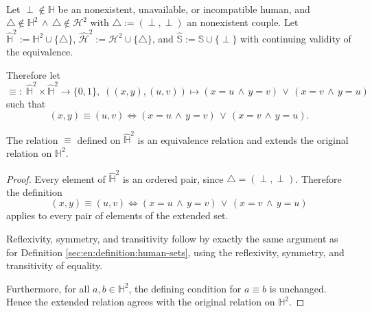 \begin{definition}\label{sec:en:definition:extended-human-sets}
    \leavevmode\\
    Let $\perp\notin\mathbb{H}$ be an nonexistent, unavailable, or incompatible human, and $\triangle\notin\mathbb{H}^2\,\land\,\triangle\notin\mathcal{H}^2$ with $\triangle:=(\perp,\perp)$ an nonexistent couple.
    Let $\hat{\mathbb{H}}^2:=\mathbb{H}^2\cup\{\triangle\}$, $\hat{\mathcal{H}}^2:=\mathcal{H}^2\cup\{\triangle\}$, and $\hat{\mathbb{S}}:=\mathbb{S}\cup\{\perp\}$ with continuing validity of the equivalence.

    Therefore let
    $$\equiv:\;\hat{\mathbb{H}}^2\times\hat{\mathbb{H}}^2\rightarrow\{0,1\},\;((x,y),(u,v))\mapsto (x=u\,\land\,y=v)\,\lor\,(x=v\,\land\,y=u)$$
    such that
    $$(x,y)\equiv(u,v)\Longleftrightarrow(x=u\,\land\,y=v)\,\lor\,(x=v\,\land\,y=u).$$
\end{definition}

\begin{theorem}
    \begin{statement}
        The relation $\equiv$ defined on $\hat{\mathbb{H}}^2$ is an equivalence relation and extends the original relation on $\mathbb{H}^2$.
    \end{statement}
    \begin{proof}
        Every element of $\hat{\mathbb{H}}^2$ is an ordered pair, since $\triangle=(\perp,\perp)$. Therefore the definition
        $$(x,y)\equiv(u,v)\Longleftrightarrow(x=u\,\land\,y=v)\,\lor\,(x=v\,\land\,y=u)$$
        applies to every pair of elements of the extended set.

        Reflexivity, symmetry, and transitivity follow by exactly the same argument as for Definition \ref{sec:en:definition:human-sets}, using the reflexivity, symmetry, and transitivity of equality.

        Furthermore, for all \(a,b\in\mathbb H^2\), the defining condition for \(a\equiv b\) is unchanged. Hence the extended relation agrees with the original relation on \(\mathbb H^2\).
    \end{proof}
\end{theorem}

